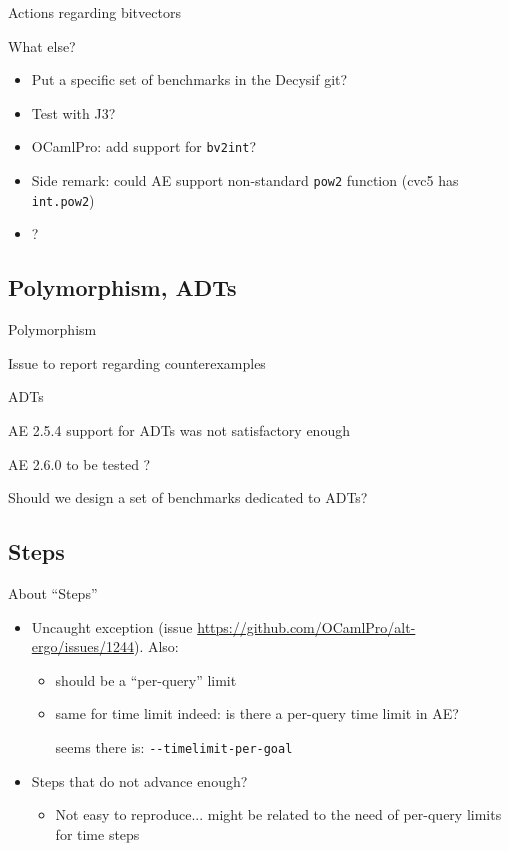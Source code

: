 \documentclass[aspectratio=169]{beamer}
\begin{document}
\begin{frame}{Actions regarding bitvectors}

  What else?

  \begin{itemize}
  \item Put a specific set of benchmarks in the Decysif git?
  \item Test with J3?
  \item OCamlPro: add support for \texttt{bv2int}?
  \item Side remark: could AE support non-standard \texttt{pow2} function (cvc5 has \texttt{int.pow2})
  \item ?
  \end{itemize}

\end{frame}

\subsection{Polymorphism, ADTs}

\begin{frame}{Polymorphism}

  Issue to report regarding counterexamples

\end{frame}

\begin{frame}{ADTs}

  AE 2.5.4 support for ADTs was not satisfactory enough

  AE 2.6.0 to be tested ?

  Should we design a set of benchmarks dedicated to ADTs?

\end{frame}

\subsection{Steps}

\begin{frame}{About ``Steps''}

  \begin{itemize}
  \item Uncaught exception (issue
    \url{https://github.com/OCamlPro/alt-ergo/issues/1244}). Also:
    \begin{itemize}
    \item should be a ``per-query'' limit
    \item same for time limit indeed: is there a per-query time limit in AE?

      seems there is: \texttt{-{}-timelimit-per-goal}
    \end{itemize}
  \item Steps that do not advance enough?
    \begin{itemize}
    \item Not easy to reproduce... might be related to the need of
      per-query limits for time steps
    \end{itemize}
  \end{itemize}

\end{frame}
\end{document}
